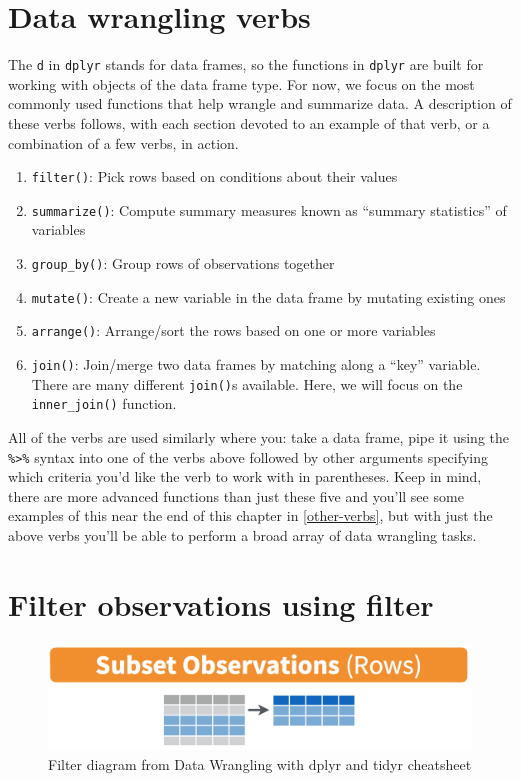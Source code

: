 \documentclass[12pt,]{krantz}
\providecommand{\tightlist}{%
  \setlength{\itemsep}{0pt}\setlength{\parskip}{0pt}}
\theoremstyle{definition}
\theoremstyle{definition}
\theoremstyle{definition}
\theoremstyle{remark}
\begin{document}
\section{Data wrangling verbs}\label{verbs}

The \texttt{d} in \texttt{dplyr} stands for data frames, so the
functions in \texttt{dplyr} are built for working with objects of the
data frame type. For now, we focus on the most commonly used functions
that help wrangle and summarize data. A description of these verbs
follows, with each section devoted to an example of that verb, or a
combination of a few verbs, in action.

\begin{enumerate}
\def\labelenumi{\arabic{enumi}.}
\tightlist
\item
  \texttt{filter()}: Pick rows based on conditions about their values
\item
  \texttt{summarize()}: Compute summary measures known as ``summary
  statistics'' of variables
\item
  \texttt{group\_by()}: Group rows of observations together
\item
  \texttt{mutate()}: Create a new variable in the data frame by mutating
  existing ones
\item
  \texttt{arrange()}: Arrange/sort the rows based on one or more
  variables
\item
  \texttt{join()}: Join/merge two data frames by matching along a
  ``key'' variable. There are many different \texttt{join()}s available.
  Here, we will focus on the \texttt{inner\_join()} function.
\end{enumerate}

All of the verbs are used similarly where you: take a data frame, pipe
it using the \texttt{\%\textgreater{}\%} syntax into one of the verbs
above followed by other arguments specifying which criteria you'd like
the verb to work with in parentheses. Keep in mind, there are more
advanced functions than just these five and you'll see some examples of
this near the end of this chapter in \ref{other-verbs}, but with just
the above verbs you'll be able to perform a broad array of data
wrangling tasks.

\section{Filter observations using filter}\label{filter}

\begin{figure}

{\centering \includegraphics[width=\textwidth]{images/filter} 

}

\caption{Filter diagram from Data Wrangling with dplyr and tidyr cheatsheet}\label{fig:filter}
\end{figure}
\end{document}
